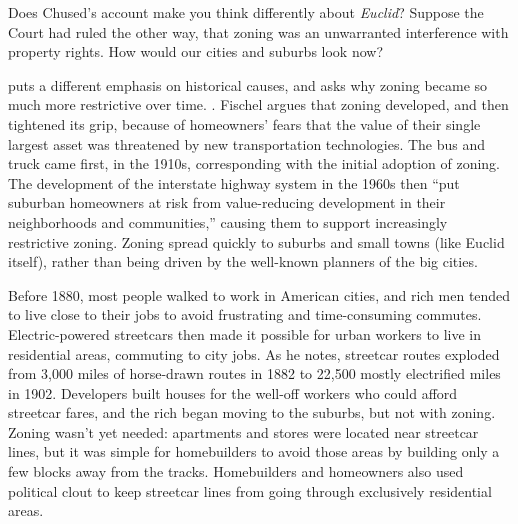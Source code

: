 
\item
Does Chused's account make you think differently about \textit{Euclid}? Suppose
the Court had ruled the other way, that zoning was an unwarranted interference
with property rights. How would our cities and suburbs look now?


\item
{}
puts a different emphasis on historical causes,
and asks why zoning became so much more restrictive over time.
. Fischel argues
that zoning developed, and then tightened its grip, because of homeowners' fears
that the value of their single largest asset was threatened by new
transportation technologies. The bus and truck came first, in the 1910s,
corresponding with the initial adoption of zoning. The development of the
interstate highway system in the 1960s then ``put suburban homeowners at risk
from value-reducing development in their neighborhoods and communities,''
causing them to support increasingly restrictive zoning. Zoning spread quickly
to suburbs and small towns (like Euclid itself), rather than being driven by the
well-known planners of the big cities. 

Before 1880, most people walked to work in American cities, and rich men tended
to live close to their jobs to avoid frustrating and time-consuming commutes.
Electric-powered streetcars then made it possible for urban workers to live in
residential areas, commuting to city jobs. As he notes, streetcar routes
exploded from 3,000 miles of horse-drawn routes in 1882 to 22,500 mostly
electrified miles in 1902. Developers built houses for the well-off workers who
could afford streetcar fares, and the rich began moving to the suburbs, but not
with zoning. Zoning wasn't yet needed: apartments and stores were located near
streetcar lines, but it was simple for homebuilders to avoid those areas by
building only a few blocks away from the tracks. Homebuilders and homeowners
also used political clout to keep streetcar lines from going through exclusively
residential areas.

